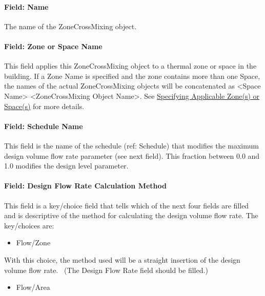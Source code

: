 \paragraph{Field: Name}\label{field-name-6-003}

The name of the ZoneCrossMixing object.

\paragraph{Field: Zone or Space Name}\label{field-zone-name-4}

This field applies this ZoneCrossMixing object to a thermal zone or space in the building. If a Zone Name is specified and the zone contains more than one Space, the names of the actual ZoneCrossMixing objects will be concatenated as \textless{}Space Name\textgreater{} \textless{}ZoneCrossMixing Object Name\textgreater{}. See \hyperref[specifying-applicable-zones-or-spaces]{Specifying Applicable Zone(s) or Space(s)} for more details.

\paragraph{Field: Schedule Name}\label{field-schedule-name-4}

This field is the name of the schedule (ref: Schedule) that modifies the maximum design volume flow rate parameter (see next field). This fraction between 0.0 and 1.0 modifies the design level parameter.

\paragraph{Field: Design Flow Rate Calculation Method}\label{field-design-flow-rate-calculation-method-3}

This field is a key/choice field that tells which of the next four fields are filled and is descriptive of the method for calculating the design volume flow rate. The key/choices are:

\begin{itemize}
\tightlist
\item
  Flow/Zone
\end{itemize}

With this choice, the method used will be a straight insertion of the design volume flow rate.~ (The Design Flow Rate field should be filled.)

\begin{itemize}
\tightlist
\item
  Flow/Area
\end{itemize}

